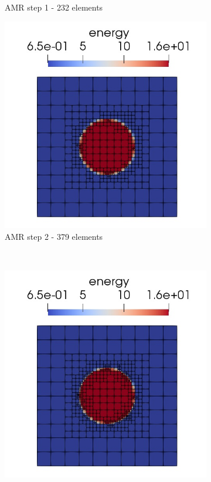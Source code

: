 \begin{figure}[H]
\begin{subfigure}[H]{40mm}
					\caption{AMR step 1 - 232 elements}
	\end{subfigure}
	\hspace{7mm}
	\begin{subfigure}[H]{40mm}
					\includegraphics[width=\textwidth]{img/adapt/sln2.jpg}
					\caption{AMR step 2 - 379 elements}
	\end{subfigure}
	\\
	\begin{subfigure}[H]{40mm}
					\includegraphics[width=\textwidth]{img/adapt/sln3.jpg}

\end{subfigure}
\end{figure}
